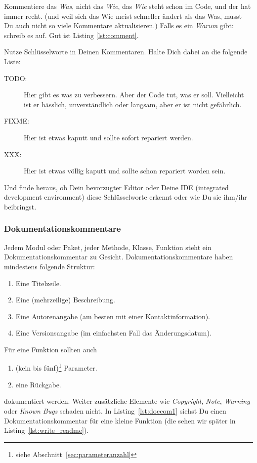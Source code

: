 \documentclass[twoside]{scrartcl}
\begin{document}
Kommentiere das \emph{Was}, nicht das \emph{Wie}, das \emph{Wie} steht schon im 
Code, und der hat immer recht.
(und weil sich das Wie meist schneller \"a{}ndert als das Was, musst Du auch
nicht so viele Kommentare aktualisieren.)
Falls es ein \emph{Warum} gibt: schreib es auf. 
Gut ist  Listing \ref{lst:comment}.



Nutze Schl\"u{}sselworte in Deinen Kommentaren. Halte Dich dabei an die folgende
Liste:
\begin{description}
\item[TODO:] Hier gibt es was zu verbessern. Aber der Code tut, was er soll.
  Vielleicht ist er h\"a{}sslich, unverst\"a{}ndlich oder langsam,
  aber er ist nicht gef\"a{}hrlich.
\item[FIXME:] Hier ist etwas kaputt und sollte sofort repariert werden.
\item[XXX:] Hier ist etwas v\"o{}llig kaputt und sollte schon repariert
  worden sein.
\end{description}
Und finde heraus, ob Dein bevorzugter Editor oder Deine IDE (integrated
development environment) diese Schl\"u{}sselworte erkennt oder wie Du sie
ihm/ihr beibringst.

\subsubsection{Dokumentationskommentare\label{sec:doccom}}
Jedem Modul oder Paket, jeder Methode, Klasse, Funktion steht ein
Dokumentationskommentar zu Gesicht. Dokumentationskommentare haben mindestens 
folgende Struktur:
\begin{enumerate}
    \item Eine Titelzeile.
    \item Eine (mehrzeilige) Beschreibung.
    \item Eine Autorenangabe (am besten mit einer Kontaktinformation).
    \item Eine Versionsangabe (im einfachsten Fall das \"A{}nderungsdatum).
\end{enumerate}
F\"u{}r eine Funktion sollten auch 
\begin{enumerate}[resume]
    \item (kein bis f\"u{}nf)\footnote{siehe
	    Abschnitt~\ref{sec:parameteranzahl}} Parameter. 
    \item eine R\"u{}ckgabe.
\end{enumerate}
dokumentiert werden. Weiter zus\"a{}tzliche Elemente wie \emph{Copyright},
\emph{Note}, \emph{Warning} oder \emph{Known Bugs} schaden nicht.
In Listing~\ref{lst:doccom1} siehst Du einen Dokumentationskommentar
f\"u{}r eine kleine Funktion (die sehen wir sp\"a{}ter in
Listing~\ref{lst:write_readme}).
\end{document}
